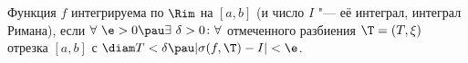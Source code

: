
 	Функция $f$ интегрируема по $\Rim$ на $[a,b]$ (и число $I$ "--- её интеграл, интеграл Римана), если
 	$\forall\  \e>0\pau \exists\ \delta>0\colon\forall$ отмеченного разбиения $\T=(T,\xi)$ отрезка $[a,b]$ с
 	$\diam T<\delta\pau |\sigma(f,\T)-I|<\e$.
 